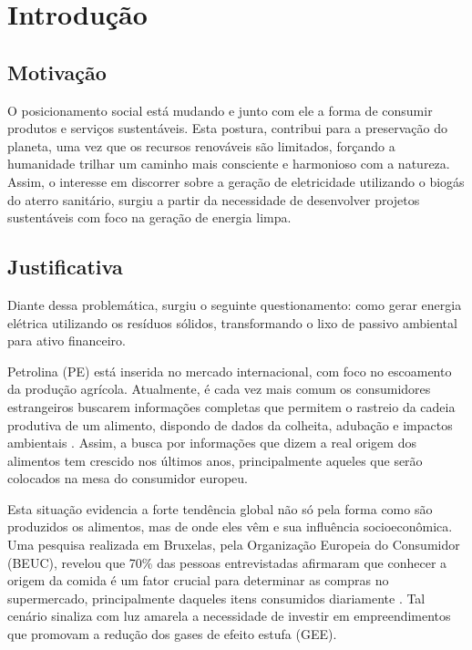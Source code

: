 \chapter{Introdução}



\section{Motivação}


O posicionamento social está mudando e junto com ele a forma de consumir produtos e serviços sustentáveis. Esta postura, contribui para a preservação do planeta, uma vez que os recursos renováveis são limitados, forçando a humanidade trilhar um caminho mais consciente e harmonioso com a natureza. Assim, o interesse em discorrer sobre a geração de eletricidade utilizando o biogás do aterro sanitário, surgiu a partir da necessidade de desenvolver projetos sustentáveis com foco na geração de energia limpa. 


\section{Justificativa}

Diante dessa problemática, surgiu o seguinte questionamento: como gerar energia elétrica utilizando os resíduos sólidos, transformando o lixo de passivo ambiental para ativo financeiro.

Petrolina (PE) está inserida no mercado internacional, com foco no escoamento da produção agrícola. Atualmente, é cada vez mais comum os consumidores estrangeiros buscarem informações completas que permitem o rastreio da cadeia produtiva de um alimento, dispondo de dados da colheita, adubação e impactos ambientais \cite{europa}. Assim, a busca por informações que dizem a real origem dos alimentos tem crescido nos últimos anos, principalmente aqueles que serão colocados na mesa do consumidor europeu. 

Esta situação evidencia a forte tendência global não só pela forma como são produzidos os alimentos, mas de onde eles vêm e sua influência socioeconômica. Uma pesquisa realizada em Bruxelas, pela Organização Europeia do Consumidor (BEUC), revelou que 70\% das pessoas entrevistadas afirmaram que conhecer a origem da comida é um fator crucial para determinar as compras no supermercado, principalmente daqueles itens consumidos diariamente \cite[pág. 6]{beuc:consumo}. Tal cenário sinaliza com luz amarela a necessidade de investir em empreendimentos que promovam a redução dos gases de efeito estufa (GEE).

